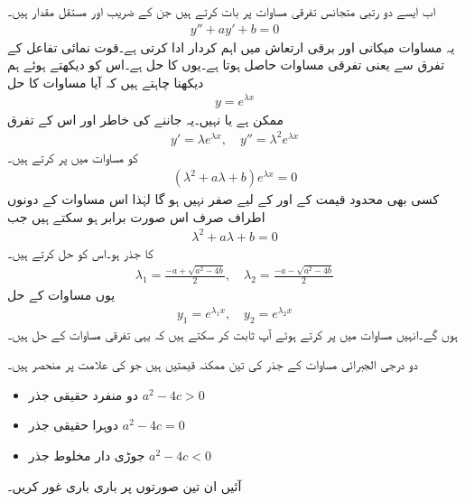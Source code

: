 اب ایسے دو رتبی متجانس تفرقی مساوات پر بات کرتے ہیں جن کے  ضریب   اور  مستقل مقدار ہیں۔
\begin{align}\label{مساوات_سادہ_دو_درجی_مستقل_عددی_سر_الف}
y''+ay'+b=0
\end{align} 
یہ مساوات میکانی اور برقی ارتعاش میں اہم کردار ادا کرتی ہے۔قوت نمائی تفاعل  کے تفرق سے  یعنی  تفرقی مساوات حاصل ہوتا ہے۔یوں  کا حل  ہے۔اس کو دیکھتے ہوئے ہم دیکھنا چاہتے ہیں کہ آیا مساوات  کا حل
\begin{align}\label{مساوات_سادہ_دو_درجی_مستقل_عددی_سر_ب}
y=e^{\lambda x}
\end{align}
 ممکن ہے یا نہیں۔یہ جاننے کی خاطر  اور اس کے تفرق
\begin{align*}
y'=\lambda e^{\lambda x}, \quad y''=\lambda^2 e^{\lambda x}
\end{align*}
 کو  مساوات  میں پر کرتے  ہیں۔
\begin{align*}
(\lambda^2+a\lambda+b)e^{\lambda x}=0
\end{align*}  
کسی بھی محدود قیمت کے  اور  کے لیے  صفر نہیں ہو گا لہٰذا اس مساوات کے دونوں اطراف صرف اس صورت برابر ہو سکتے ہیں جب  
 \begin{align}\label{مساوات_سادہ_دو_درجی_مستقل_عددی_سر_پ}
\lambda^2+a\lambda+b=0
\end{align}
 کا جذر ہو۔اس  کو حل کرتے ہیں۔
\begin{align}\label{مساوات_سادہ_دو_درجی_مستقل_عددی_سر_ت}
\lambda_1=\frac{-a+\sqrt{a^2-4b}}{2}, \quad \lambda_2=\frac{-a-\sqrt{a^2-4b}}{2}
\end{align}
یوں مساوات  کے حل
\begin{align}
y_1=e^{\lambda_1 x}, \quad y_2=e^{\lambda_2 x}
\end{align}
ہوں گے۔انہیں مساوات  میں پر کرتے ہوئے آپ ثابت کر سکتے ہیں کہ یہی تفرقی مساوات کے حل ہیں۔

دو درجی الجبرائی مساوات  کے جذر کی تین ممکنہ قیمتیں ہیں جو  کی علامت   پر منحصر ہیں۔
\begin{itemize}\label{لسٹ_سادہ_دو_درجی_تین_صورتیں_الف}
\item[پہلی صورت:]
دو منفرد حقیقی جذر \quad $a^2-4c>0$ 
\item[دوسری صورت:]
 دوہرا حقیقی جذر \quad $a^2-4c=0$ 
\item[تیسری صورت:]
 جوڑی دار مخلوط جذر \quad $a^2-4c<0$ 
\end{itemize}
آئیں ان تین صورتوں پر باری باری غور کریں۔

